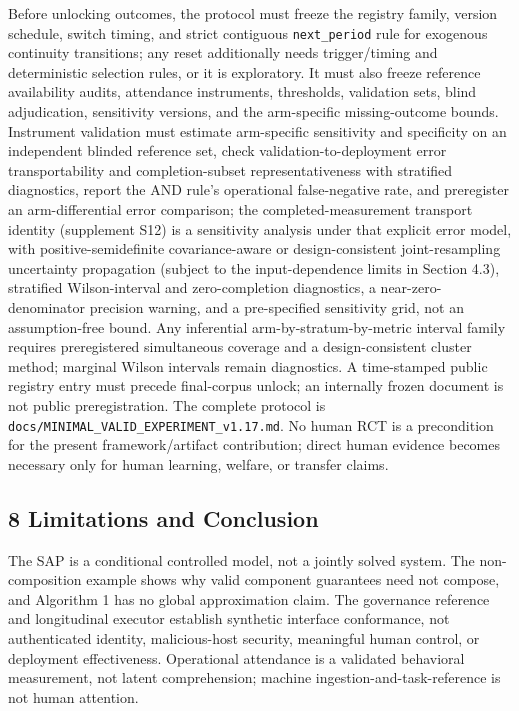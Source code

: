 \documentclass[
  11pt]{article}
\begin{document}
Before unlocking outcomes, the protocol must freeze the registry family,
version schedule, switch timing, and strict contiguous
\texttt{next\_period} rule for exogenous continuity transitions; any
reset additionally needs trigger/timing and deterministic selection
rules, or it is exploratory. It must also freeze reference availability
audits, attendance instruments, thresholds, validation sets, blind
adjudication, sensitivity versions, and the arm-specific missing-outcome
bounds. Instrument validation must estimate arm-specific sensitivity and
specificity on an independent blinded reference set, check
validation-to-deployment error transportability and completion-subset
representativeness with stratified diagnostics, report the AND rule's
operational false-negative rate, and preregister an arm-differential
error comparison; the completed-measurement transport identity
(supplement S12) is a sensitivity analysis under that explicit error
model, with positive-semidefinite covariance-aware or design-consistent
joint-resampling uncertainty propagation (subject to the
input-dependence limits in Section 4.3), stratified Wilson-interval and
zero-completion diagnostics, a near-zero-denominator precision warning,
and a pre-specified sensitivity grid, not an assumption-free bound. Any
inferential arm-by-stratum-by-metric interval family requires
preregistered simultaneous coverage and a design-consistent cluster
method; marginal Wilson intervals remain diagnostics. A time-stamped
public registry entry must precede final-corpus unlock; an internally
frozen document is not public preregistration. The complete protocol is
\texttt{docs/MINIMAL\_VALID\_EXPERIMENT\_v1.17.md}. No human RCT is a
precondition for the present framework/artifact contribution; direct
human evidence becomes necessary only for human learning, welfare, or
transfer claims.

\subsection{8 Limitations and
Conclusion}\label{limitations-and-conclusion}

The SAP is a conditional controlled model, not a jointly solved system.
The non-composition example shows why valid component guarantees need
not compose, and Algorithm 1 has no global approximation claim. The
governance reference and longitudinal executor establish synthetic
interface conformance, not authenticated identity, malicious-host
security, meaningful human control, or deployment effectiveness.
Operational attendance is a validated behavioral measurement, not latent
comprehension; machine ingestion-and-task-reference is not human
attention.
\end{document}
